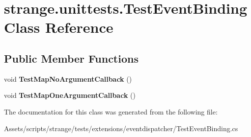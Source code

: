 \hypertarget{classstrange_1_1unittests_1_1_test_event_binding}{\section{strange.\-unittests.\-Test\-Event\-Binding Class Reference}
\label{classstrange_1_1unittests_1_1_test_event_binding}
}
\subsection*{Public Member Functions}
\begin{DoxyCompactItemize}
\item 
\hypertarget{classstrange_1_1unittests_1_1_test_event_binding_acd1ac4d843ee6743034b6295b72982c2}{void {\bfseries Test\-Map\-No\-Argument\-Callback} ()}\label{classstrange_1_1unittests_1_1_test_event_binding_acd1ac4d843ee6743034b6295b72982c2}

\item 
\hypertarget{classstrange_1_1unittests_1_1_test_event_binding_a2a882d6475b7c8df6541d200c93af28f}{void {\bfseries Test\-Map\-One\-Argument\-Callback} ()}\label{classstrange_1_1unittests_1_1_test_event_binding_a2a882d6475b7c8df6541d200c93af28f}

\end{DoxyCompactItemize}


The documentation for this class was generated from the following file\-:\begin{DoxyCompactItemize}
\item 
Assets/scripts/strange/tests/extensions/eventdispatcher/Test\-Event\-Binding.\-cs\end{DoxyCompactItemize}
